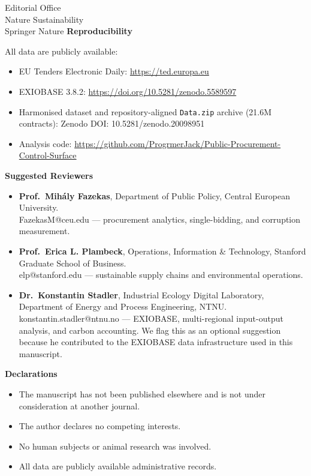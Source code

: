 \documentclass[11pt]{letter}
\begin{document}
\begin{letter}{Editorial Office\\Nature Sustainability\\Springer Nature}
\textbf{Reproducibility}

All data are publicly available:
\begin{itemize}[noitemsep,topsep=0pt]
    \item EU Tenders Electronic Daily: \url{https://ted.europa.eu}
    \item EXIOBASE 3.8.2: \url{https://doi.org/10.5281/zenodo.5589597}
    \item Harmonised dataset and repository-aligned \texttt{Data.zip} archive (21.6M contracts): Zenodo DOI: 10.5281/zenodo.20098951
    \item Analysis code: \url{https://github.com/ProgrmerJack/Public-Procurement-Control-Surface}
\end{itemize}

\textbf{Suggested Reviewers}

\begin{itemize}[leftmargin=*,itemsep=2pt,topsep=0pt]
    \item \textbf{Prof.\ Mih\'{a}ly Fazekas}, Department of Public Policy, Central European University.\\
    FazekasM@ceu.edu --- procurement analytics, single-bidding, and corruption measurement.
    \item \textbf{Prof.\ Erica L. Plambeck}, Operations, Information \& Technology, Stanford Graduate School of Business.\\
    elp@stanford.edu --- sustainable supply chains and environmental operations.
    \item \textbf{Dr.\ Konstantin Stadler}, Industrial Ecology Digital Laboratory, Department of Energy and Process Engineering, NTNU.\\
    konstantin.stadler@ntnu.no --- EXIOBASE, multi-regional input-output analysis, and carbon accounting. We flag this as an optional suggestion because he contributed to the EXIOBASE data infrastructure used in this manuscript.
\end{itemize}

\textbf{Declarations}

\begin{itemize}[noitemsep,topsep=0pt]
    \item The manuscript has not been published elsewhere and is not under consideration at another journal.
    \item The author declares no competing interests.
    \item No human subjects or animal research was involved.
    \item All data are publicly available administrative records.
\end{itemize}


\end{letter}
\end{document}
